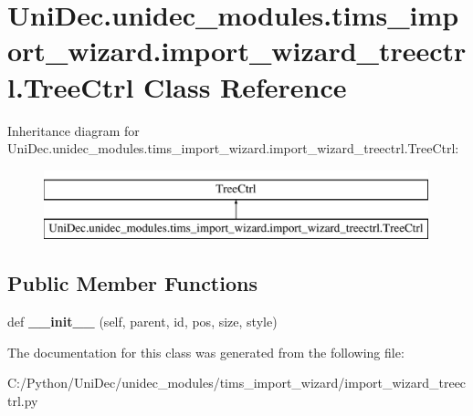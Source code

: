 \hypertarget{class_uni_dec_1_1unidec__modules_1_1tims__import__wizard_1_1import__wizard__treectrl_1_1_tree_ctrl}{}\section{Uni\+Dec.\+unidec\+\_\+modules.\+tims\+\_\+import\+\_\+wizard.\+import\+\_\+wizard\+\_\+treectrl.\+Tree\+Ctrl Class Reference}
\label{class_uni_dec_1_1unidec__modules_1_1tims__import__wizard_1_1import__wizard__treectrl_1_1_tree_ctrl}
Inheritance diagram for Uni\+Dec.\+unidec\+\_\+modules.\+tims\+\_\+import\+\_\+wizard.\+import\+\_\+wizard\+\_\+treectrl.\+Tree\+Ctrl\+:\begin{figure}[H]
\begin{center}
\leavevmode
\includegraphics[height=2.000000cm]{class_uni_dec_1_1unidec__modules_1_1tims__import__wizard_1_1import__wizard__treectrl_1_1_tree_ctrl}
\end{center}
\end{figure}
\subsection*{Public Member Functions}
\begin{DoxyCompactItemize}
\item 
\hypertarget{class_uni_dec_1_1unidec__modules_1_1tims__import__wizard_1_1import__wizard__treectrl_1_1_tree_ctrl_a67894eb899345cdb4b9fd5cf7f4d5d27}{}def {\bfseries \+\_\+\+\_\+init\+\_\+\+\_\+} (self, parent, id, pos, size, style)\label{class_uni_dec_1_1unidec__modules_1_1tims__import__wizard_1_1import__wizard__treectrl_1_1_tree_ctrl_a67894eb899345cdb4b9fd5cf7f4d5d27}

\end{DoxyCompactItemize}


The documentation for this class was generated from the following file\+:\begin{DoxyCompactItemize}
\item 
C\+:/\+Python/\+Uni\+Dec/unidec\+\_\+modules/tims\+\_\+import\+\_\+wizard/import\+\_\+wizard\+\_\+treectrl.\+py\end{DoxyCompactItemize}
